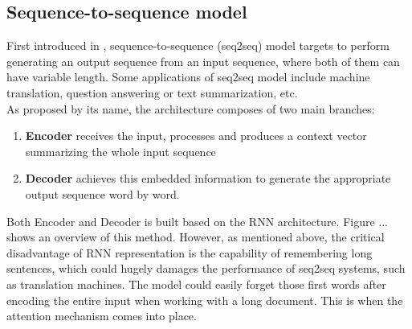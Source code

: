 \subsection{Sequence-to-sequence model}
First introduced in \cite{sutskever2014sequence}, sequence-to-sequence (seq2seq) model targets to perform generating an output sequence from an input sequence, where both of them can have variable length. Some applications of seq2seq model include machine translation, question answering or text summarization, etc. \\
As proposed by its name, the architecture composes of two main branches:
\begin{enumerate}
    \item \textbf{Encoder} receives the input, processes and produces a context vector summarizing the whole input sequence
    \item \textbf{Decoder} achieves this embedded information to generate the appropriate output sequence word by word.
\end{enumerate}
Both Encoder and Decoder is built based on the RNN architecture. Figure ... shows an overview of this method. 
However, as mentioned above, the critical disadvantage of RNN representation is the capability of remembering long sentences, which could hugely damages the performance of seq2seq systems, such as translation machines. 
The model could easily forget those first words after encoding the entire input when working with a long document. 
This is when the attention mechanism \cite{bahdanau2014neural} comes into place.

